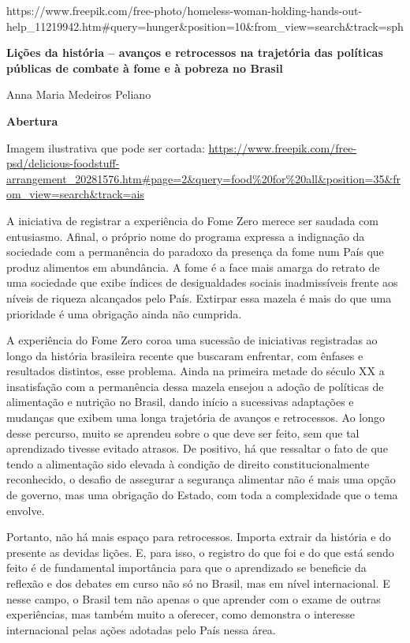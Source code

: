 \begin{itemize}
\begin{itemize}
{\begin{itemize}
\begin{itemize}
https://www.freepik.com/free-photo/homeless-woman-holding-hands-out-help\_11219942.htm\#query=hunger\&position=10\&from\_view=search\&track=sph

\textbf{Lições da história -- avanços e retrocessos na trajetória das
políticas públicas de combate à fome e à pobreza no Brasil}

Anna Maria Medeiros Peliano

\textbf{Abertura}

Imagem ilustrativa que pode ser cortada:
\url{https://www.freepik.com/free-psd/delicious-foodstuff-arrangement_20281576.htm\#page=2\&query=food\%20for\%20all\&position=35\&from_view=search\&track=ais}

A iniciativa de registrar a experiência do Fome Zero merece ser saudada
com entusiasmo. Afinal, o próprio nome do programa expressa a indignação
da sociedade com a permanência do paradoxo da presença da fome num País
que produz alimentos em abundância. A fome é a face mais amarga do
retrato de uma sociedade que exibe índices de desigualdades sociais
inadmissíveis frente aos níveis de riqueza alcançados pelo País.
Extirpar essa mazela é mais do que uma prioridade é uma obrigação ainda
não cumprida.

A experiência do Fome Zero coroa uma sucessão de iniciativas registradas
ao longo da história brasileira recente que buscaram enfrentar, com
ênfases e resultados distintos, esse problema. Ainda na primeira metade
do século XX a insatisfação com a permanência dessa mazela ensejou a
adoção de políticas de alimentação e nutrição no Brasil, dando início a
sucessivas adaptações e mudanças que exibem uma longa trajetória de
avanços e retrocessos. Ao longo desse percurso, muito se aprendeu sobre
o que deve ser feito, sem que tal aprendizado tivesse evitado atrasos.
De positivo, há que ressaltar o fato de que tendo a alimentação sido
elevada à condição de direito constitucionalmente reconhecido, o desafio
de assegurar a segurança alimentar não é mais uma opção de governo, mas
uma obrigação do Estado, com toda a complexidade que o tema envolve.

Portanto, não há mais espaço para retrocessos. Importa extrair da
história e do presente as devidas lições. E, para isso, o registro do
que foi e do que está sendo feito é de fundamental importância para que
o aprendizado se beneficie da reflexão e dos debates em curso não só no
Brasil, mas em nível internacional. E nesse campo, o Brasil tem não
apenas o que aprender com o exame de outras experiências, mas também
muito a oferecer, como demonstra o interesse internacional pelas ações
adotadas pelo País nessa área.


\end{itemize}
\end{itemize}}
\end{itemize}
\end{itemize}
